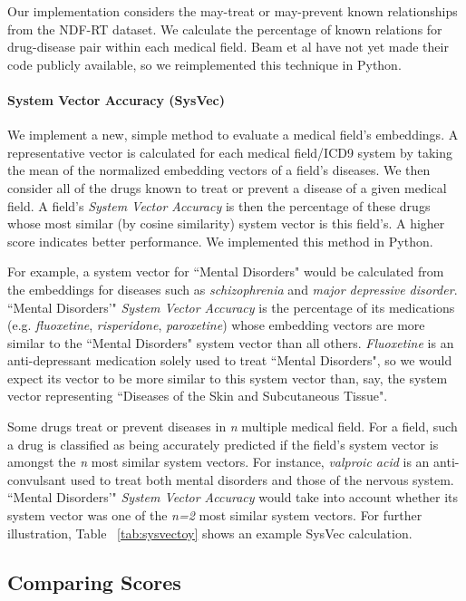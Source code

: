 \documentclass[11pt,a4paper]{article}
\begin{document}
Our implementation considers the may-treat or may-prevent known relationships from the NDF-RT dataset. We calculate the percentage of known relations for drug-disease pair within each medical field. Beam et al have not yet made their code publicly available, so we reimplemented this technique in Python. 

\paragraph{System Vector Accuracy (SysVec)}
We implement a new, simple method to evaluate a medical field's embeddings. A representative vector is calculated for each medical field/ICD9 system by taking the mean of the normalized embedding vectors of a field's diseases. We then consider all of the drugs known to treat or prevent a disease of a given medical field. A field's \emph{System Vector Accuracy} is then the percentage of these drugs whose most similar (by cosine similarity) system vector is this field's. A higher score indicates better performance. We implemented this method in Python. 

For example, a system vector for ``Mental Disorders" would be calculated from the embeddings for diseases such as \emph{schizophrenia} and \emph{major depressive disorder}. ``Mental Disorders'" \emph{System Vector Accuracy} is the percentage of its medications (e.g. \emph{fluoxetine}, \emph{risperidone}, \emph{paroxetine}) whose embedding vectors are more similar to the ``Mental Disorders" system vector than all others. \emph{Fluoxetine} is an anti-depressant medication solely used to treat ``Mental Disorders", so we would expect its vector to be more similar to this system vector than, say, the system vector representing ``Diseases of the Skin and Subcutaneous Tissue". 

Some drugs treat or prevent diseases in \emph{n} multiple medical field. For a field, such a drug is classified as being accurately predicted if the field's system vector is amongst the \emph{n} most similar system vectors. For instance, \emph{valproic acid} is an anti-convulsant used to treat both mental disorders and those of the nervous system. ``Mental Disorders'" \emph{System Vector Accuracy} would take into account whether its system vector was one of the \emph{n=2} most similar system vectors. For further illustration, Table ~\ref{tab:sysvectoy} shows an example SysVec calculation.



\subsection{Comparing Scores}
\end{document}
